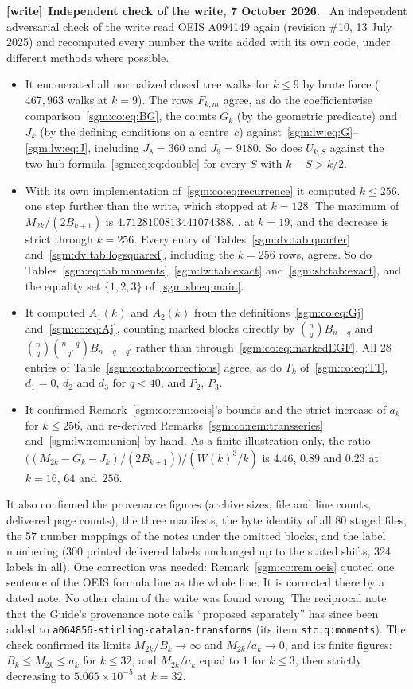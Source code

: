 \documentclass[11pt,letterpaper]{article}
\theoremstyle{remark}\newtheorem{remark}[theorem]{Remark}
\newcommand{\file}[1]{\nolinkurl{#1}}
\newenvironment{writenote}[1][]{\par\smallskip\begingroup\small
 \noindent\textbf{[write]}\if\relax\detokenize{#1}\relax\else~\textbf{#1.}\fi\ }%
 {\par\endgroup\smallskip}
\theoremstyle{definition}\newtheorem{definition}[theorem]{Definition}
\begin{document}
\begin{writenote}[Independent check of the write, 7 October 2026]
An independent adversarial check of the write read OEIS A094149 again (revision \#10, 13 July 2025) and recomputed every number the write added with its own code, under different methods where possible.
\begin{itemize}
\item It enumerated all normalized closed tree walks for $k\le9$ by brute force ($467{,}963$ walks at $k=9$). The rows $F_{k,m}$ agree, as do the coefficientwise comparison~\eqref{sgm:co:eq:BG}, the counts $G_k$ (by the geometric predicate) and $J_k$ (by the defining conditions on a centre~$c$) against~\eqref{sgm:lw:eq:G}--\eqref{sgm:lw:eq:J}, including $J_8=360$ and $J_9=9180$. So does $U_{k,S}$ against the two-hub formula~\eqref{sgm:eq:eq:double} for every $S$ with $k-S>k/2$.
\item With its own implementation of~\eqref{sgm:co:eq:recurrence} it computed $k\le256$, one step further than the write, which stopped at $k=128$. The maximum of $M_{2k}/(2B_{k+1})$ is $4.7128100813441074388\ldots$ at $k=19$, and the decrease is strict through $k=256$. Every entry of Tables~\ref{sgm:dv:tab:quarter} and~\ref{sgm:dv:tab:logsquared}, including the $k=256$ rows, agrees. So do Tables~\ref{sgm:eq:tab:moments}, \ref{sgm:lw:tab:exact} and~\ref{sgm:sb:tab:exact}, and the equality set $\{1,2,3\}$ of~\eqref{sgm:sb:eq:main}.
\item It computed $A_1(k)$ and $A_2(k)$ from the definitions~\eqref{sgm:co:eq:Gj} and~\eqref{sgm:co:eq:Aj}, counting marked blocks directly by $\binom nqB_{n-q}$ and $\binom nq\binom{n-q}{q'}B_{n-q-q'}$ rather than through~\eqref{sgm:co:eq:markedEGF}. All 28 entries of Table~\ref{sgm:co:tab:corrections} agree, as do $T_k$ of~\eqref{sgm:co:eq:T1}, $d_1=0$, $d_2$ and $d_3$ for $q<40$, and $P_2$, $P_3$.
\item It confirmed Remark~\ref{sgm:co:rem:oeis}'s bounds and the strict increase of $a_k$ for $k\le256$, and re-derived Remarks~\ref{sgm:co:rem:transseries} and~\ref{sgm:lw:rem:union} by hand. As a finite illustration only, the ratio $\bigl((M_{2k}-G_k-J_k)/(2B_{k+1})\bigr)/(W(k)^3/k)$ is $4.46$, $0.89$ and $0.23$ at $k=16$, $64$ and~$256$.
\end{itemize}
It also confirmed the provenance figures (archive sizes, file and line counts, delivered page counts), the three manifests, the byte identity of all 80 staged files, the 57 number mappings of the notes under the omitted blocks, and the label numbering (300 printed delivered labels unchanged up to the stated shifts, 324 labels in all). One correction was needed: Remark~\ref{sgm:co:rem:oeis} quoted one sentence of the OEIS formula line as the whole line. It is corrected there by a dated note. No other claim of the write was found wrong. The reciprocal note that the Guide's provenance note calls ``proposed separately'' has since been added to \file{a064856-stirling-catalan-transforms} (its item \file{stc:q:moments}). The check confirmed its limits $M_{2k}/B_k\to\infty$ and $M_{2k}/a_k\to0$, and its finite figures: $B_k\le M_{2k}\le a_k$ for $k\le32$, and $M_{2k}/a_k$ equal to $1$ for $k\le3$, then strictly decreasing to $5.065\times10^{-5}$ at $k=32$.
\end{writenote}
\end{document}
